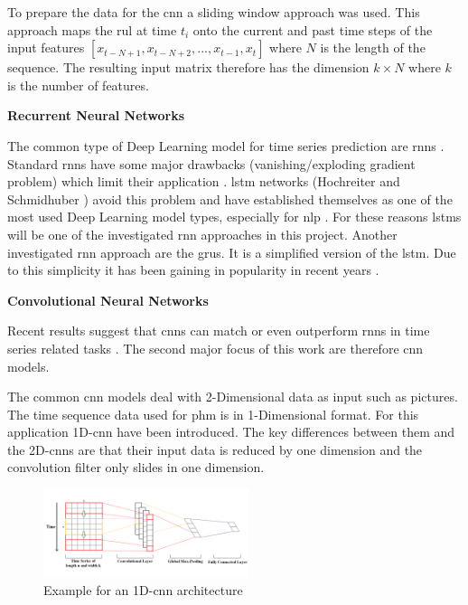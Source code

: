 \documentclass[conference]{IEEEtran}
\begin{document}
To prepare the data for the \gls{cnn} a sliding window approach was used. This approach maps the \gls{rul} at time $ t_i $ onto the current and past time steps of the input features $ [x_{t-N+1}, x_{t-N+2},..., x_{t-1}, x_t] $ where $ N $ is the length of the sequence. The resulting input matrix therefore has the dimension $ k \times N $ where $ k $ is the number of features.


\noindent
\textbf{Recurrent Neural Networks}

The common type of Deep Learning model for time series prediction are \glspl{rnn} \cite{Bai2018}. Standard \glspl{rnn} have some major drawbacks (vanishing/exploding gradient problem) which limit their application \cite{Bengio1994}. \gls{lstm} networks (Hochreiter and Schmidhuber \cite{Hochreiter1997}) avoid this problem and have established themselves as one of the most used Deep Learning model types, especially for \gls{nlp} \cite{Wu2016}. For these reasons \glspl{lstm} will be one of the investigated \gls{rnn} approaches in this project. Another investigated \gls{rnn} approach are the \glspl{gru}. It is a simplified version of the \gls{lstm}. Due to this simplicity it has been gaining in popularity in recent years \cite{Rana2016}. 


\noindent
\textbf{Convolutional Neural Networks}

Recent results suggest that \glspl{cnn} can match or even outperform \glspl{rnn} in time series related tasks \cite{Bai2018}. The second major focus of this work are therefore \gls{cnn} models.

The common \gls{cnn} models deal with 2-Dimensional data as input such as pictures. The time sequence data used for \gls{phm} is in 1-Dimensional format. For this application 1D-\gls{cnn} have been introduced. The key differences between them and the 2D-\glspl{cnn} are that their input data is reduced by one dimension and the convolution filter only slides in one dimension. \cite{Akrim2021}

\begin{figure}[htp]
	\centering
	\includegraphics[width=6cm]{1D_CNN_Architecture.png}
	\caption{Example for an 1D-\gls{cnn} architecture \cite{Sayyad}}
	\label{fig:1D-cnn-architecture}
\end{figure}
\end{document}
